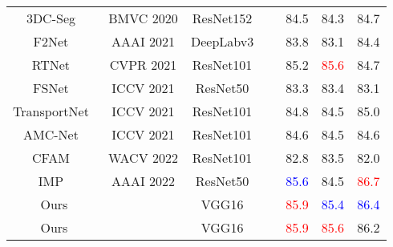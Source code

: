 \documentclass[10pt,twocolumn,letterpaper]{article}
\begin{document}
\begin{table*}[t]
\begin{center}
\begin{tabular}{c|c|c|P{1.5cm}|ccc}
			3DC-Seg~\cite{mahadevan2020making}      & BMVC 2020             & ResNet152~\cite{he2016deep}      &                       & 84.5                 & 84.3                 & 84.7                 \\
			F2Net~\cite{liu2021f2net}        & AAAI 2021             & DeepLabv3~\cite{chen2017rethinking}      &                       & 83.8                 & 83.1                 & 84.4                 \\
			RTNet~\cite{ren2021reciprocal}        & CVPR 2021             & ResNet101~\cite{he2016deep}      &                   & 85.2                 & \textcolor{red}{85.6}                 & 84.7                 \\
			FSNet~\cite{ji2021full}        & ICCV 2021             & ResNet50~\cite{he2016deep}       &                   & 83.3                 & 83.4                 & 83.1                 \\
			TransportNet~\cite{zhang2021deep} & ICCV 2021             & ResNet101~\cite{he2016deep}      &                       & 84.8                 & 84.5                 & 85.0                 \\
			AMC-Net~\cite{yang2021learning}      & ICCV 2021             & ResNet101~\cite{he2016deep}      &                   & 84.6                 & 84.5                 & 84.6                 \\
			CFAM~\cite{chen2022video}         & WACV 2022             & ResNet101~\cite{he2016deep}      &                       & 82.8                 & 83.5                 & 82.0                 \\
			IMP~\cite{lee2021iteratively}          & AAAI 2022             & ResNet50~\cite{he2016deep}       &                       & \textcolor{blue}{85.6}                 & 84.5                 & \textcolor{red}{86.7}                 \\ \hline
			Ours         &  & VGG16~\cite{simonyan2014very}          &  & \textcolor{red}{85.9} & \textcolor{blue}{85.4} & \textcolor{blue}{86.4} \\
			Ours         &                       & VGG16~\cite{simonyan2014very}          &                    &     \textcolor{red}{85.9}          &           \textcolor{red}{85.6}           &         86.2             \\ \hline
		\end{tabular}
	\end{center}
\end{table*}
\end{document}
